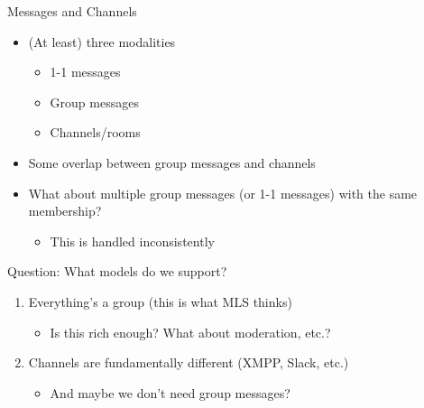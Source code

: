 \documentclass[helvetica]{beamer}
\begin{document}
\begin{frame}{Messages and Channels}
  \begin{itemize}
  \item (At least) three modalities
    \begin{itemize}
    \item 1-1 messages
        \item Group messages
    \item Channels/rooms
    \end{itemize}
    
  \item Some overlap between group messages and channels
  \item What about multiple group messages (or 1-1 messages) with the same membership?
    \begin{itemize}
    \item This is handled inconsistently
    \end{itemize}
  \end{itemize}
\end{frame}

\begin{frame}{Question: What models do we support?}

  \begin{enumerate}
  \item Everything's a group (this is what MLS thinks)
    \begin{itemize}
    \item Is this rich enough? What about moderation, etc.?      
    \end{itemize}
  \item Channels are fundamentally different (XMPP, Slack, etc.)
    \begin{itemize}
    \item And maybe we don't need group messages?
      \end{itemize}
  \end{enumerate}
\end{frame}
\end{document}
